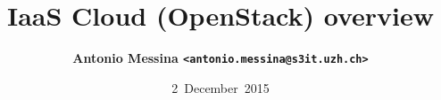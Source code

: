 \documentclass[english,serif,mathserif,usenames,dvipsnames]{beamer}
\begin{document}
\title[IaaS (OpenStack) overview]{IaaS Cloud (OpenStack) overview}

\author{%
  {\bfseries Antonio Messina \texttt{<antonio.messina@s3it.uzh.ch>}}  
}

\date{2~December~2015}

\maketitle






\end{document}
